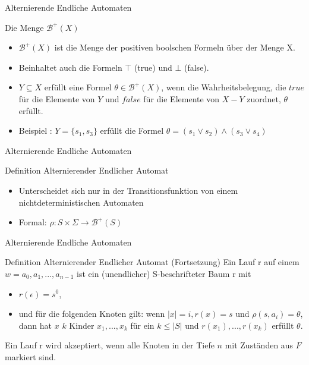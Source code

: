 \begin{frame}{Alternierende Endliche Automaten}
\begin{block}{Die Menge $\mathcal{B}^+(X)$}
\begin{itemize}
\setlength\itemsep{1em}
\item $\mathcal{B}^+(X)$ ist die Menge der positiven boolschen Formeln über der Menge X.
\item Beinhaltet auch die Formeln $\top$ (true) und $\bot$ (false).
\pause
\item $Y \subseteq X$ erfüllt eine Formel $\theta \in \mathcal{B}^+(X)$, wenn die Wahrheitsbelegung, die $true$ für die Elemente von $Y$ und $false$ für die Elemente von $X-Y$ zuordnet, $\theta$ erfüllt.
\pause
\item Beispiel \cite{vardi+96}: $Y=\{s_1,s_3\}$ erfüllt die Formel $\theta = (s_1 \vee s_2)\wedge (s_3\vee s_4)$\\
\end{itemize}
\end{block}
\end{frame}

\begin{frame}{Alternierende Endliche Automaten}
\begin{block}{Definition Alternierender Endlicher Automat}
\begin{itemize}
\setlength\itemsep{1em}
\item Unterscheidet sich nur in der Transitionsfunktion von einem nichtdeterministischen Automaten
\item Formal: $\rho: S\times \Sigma \rightarrow \mathcal{B}^+(S)$
\end{itemize}
\end{block}
\end{frame}

\begin{frame}{Alternierende Endliche Automaten}
\begin{block}{Definition Alternierender Endlicher Automat (Fortsetzung)}
Ein Lauf r auf einem $w=a_0,a_1,...,a_{n-1}$ ist ein (unendlicher) S-beschrifteter Baum r mit
\begin{itemize}
\setlength\itemsep{1em}
\item $r(\epsilon)=s^0$,
\pause
\item und für die folgenden Knoten gilt: wenn $|x|=i, r(x)=s$ und $\rho(s,a_i)=\theta$, dann hat $x$ $k$ Kinder $x_1,...,x_k$ für ein $k \leq |S|$ und $r(x_1),...,r(x_k)$ erfüllt $\theta$.
\end{itemize}
\pause
\vspace{1em}
Ein Lauf r wird akzeptiert, wenn alle Knoten in der Tiefe $n$ mit Zuständen aus $F$ markiert sind.
\end{block}
\end{frame}

